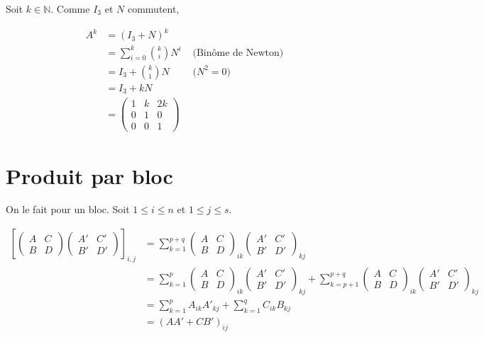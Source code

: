 \documentclass[../main.tex]{subfiles}
\begin{document}
Soit $k \in \mathbb N$. Comme $I_{3}$ et $N$ commutent, 

\begin{align*} 
A^k &= (I_{3} + N)^k \\
&= \sum^k_{i=0} \binom{k}{i} N^i & \text{ (Binôme de Newton)} \\
&= I_{3} + \binom{k}{1}N & \text{ ($N^2 = 0$)} \\
&= I_{3} + kN \\
&= \begin{pmatrix} 1 & k & 2k \\ 0 & 1 & 0 \\ 0 & 0 & 1 \end{pmatrix}
\end{align*}

\section{Produit par bloc}
On le fait pour un bloc. 
Soit $1 \leq i \leq n$ et $1 \leq j \leq s$. 

\begin{align*} 
\left [ \begin{pmatrix} A & C \\B & D \end{pmatrix} \begin{pmatrix} A' & C' \\ B' & D' \end{pmatrix} \right ]_{i,j} &= \sum^{p + q}_{k = 1} \begin{pmatrix} A & C\\B & D \end{pmatrix}_{ik} \begin{pmatrix} A' & C' \\ B' & D' \end{pmatrix}_{kj} \\
&= \sum^p_{k=1} \begin{pmatrix} A & C \\ B & D\end{pmatrix}_{ik} \begin{pmatrix} A' & C' \\ B' & D' \end{pmatrix}_{kj} + \sum^{p+q}_{k=p+1} \begin{pmatrix} A & C \\ B & D \end{pmatrix}_{ik} \begin{pmatrix} A' & C' \\ B' & D' \end{pmatrix}_{kj} \\
&= \sum^p_{k=1} A_{ik}A'_{kj} + \sum^q_{k=1} C_{ik}B_{kj} \\
&= (AA' + CB')_{ij}
\end{align*}
\end{document}
